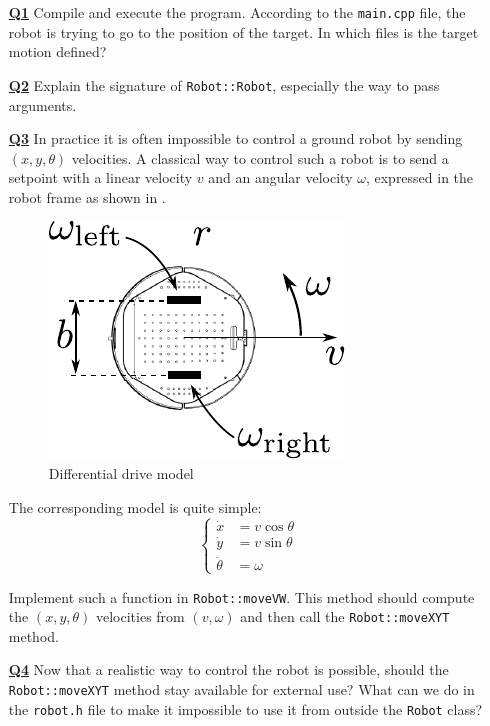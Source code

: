 \documentclass{ecnreport}
\begin{document}
\begin{itemize}
\medskip\item[\textbf{\underline{Q1}}]  Compile and execute the program. According to the \texttt{main.cpp} file, the robot is trying to go to the position of the target. In which files is the target motion defined?

\medskip\item[\textbf{\underline{Q2}}] Explain the signature of   \texttt{Robot::Robot}, especially the way to pass arguments.

\medskip\item[\textbf{\underline{Q3}}] In practice it is often impossible to control a ground robot by sending $(x,y,\theta)$ velocities. A classical way to control such a robot is to send a setpoint with a linear velocity $v$ and an angular velocity $\omega$, expressed in the robot frame as shown in .

\begin{figure}[h!]\centering
\includegraphics[width=.3\linewidth]{wheels}
\caption{\label{fig:dd} Differential drive model}
\end{figure}

The corresponding model is quite simple:
\begin{equation*}
\left\{\begin{array}{ll}
\dot x &= v\cos \theta \\
\dot y &= v\sin \theta \\
\dot \theta &= \omega
\end{array}\right.
\end{equation*}

Implement such a function in \texttt{Robot::moveVW}. This method should compute the $(x,y,\theta)$ velocities from $(v,\omega)$ and then call the \texttt{Robot::moveXYT} method. 

\medskip\item[\textbf{\underline{Q4}}] Now that a realistic way to control the robot is possible, should the \texttt{Robot::moveXYT} method stay available for external use? What can we do in the \texttt{robot.h} file to make it impossible to use it from outside the \texttt{Robot} class?


\end{itemize}
\end{document}
